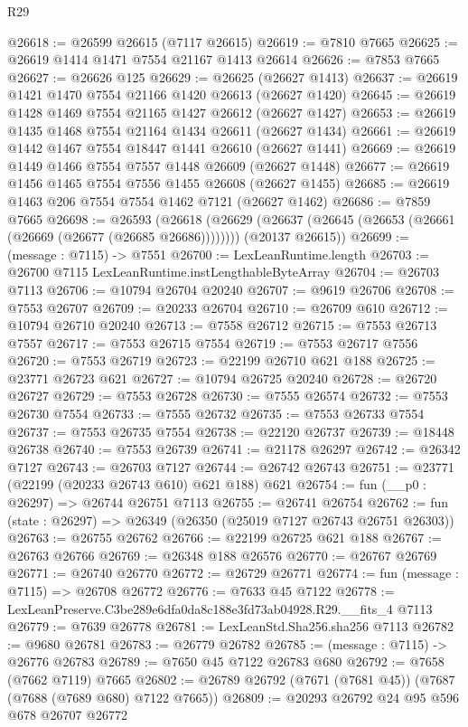 \begin{lexlean}{R29}
\begin{coremodule}
@26618 := @26599 @26615 (@7117 @26615)
@26619 := @7810 @7665
@26625 := @26619 @1414 @1471 @7554 @21167 @1413 @26614
@26626 := @7853 @7665
@26627 := @26626 @125
@26629 := @26625 (@26627 @1413)
@26637 := @26619 @1421 @1470 @7554 @21166 @1420 @26613 (@26627 @1420)
@26645 := @26619 @1428 @1469 @7554 @21165 @1427 @26612 (@26627 @1427)
@26653 := @26619 @1435 @1468 @7554 @21164 @1434 @26611 (@26627 @1434)
@26661 := @26619 @1442 @1467 @7554 @18447 @1441 @26610 (@26627 @1441)
@26669 := @26619 @1449 @1466 @7554 @7557 @1448 @26609 (@26627 @1448)
@26677 := @26619 @1456 @1465 @7554 @7556 @1455 @26608 (@26627 @1455)
@26685 := @26619 @1463 @206 @7554 @7554 @1462 @7121 (@26627 @1462)
@26686 := @7859 @7665
@26698 := @26593
    (@26618
      (@26629 (@26637 (@26645 (@26653 (@26661 (@26669 (@26677 (@26685 @26686))))))))
      (@20137 @26615))
@26699 := (message : @7115) -> @7551
@26700 := LexLeanRuntime.length
@26703 := @26700 @7115 LexLeanRuntime.instLengthableByteArray
@26704 := @26703 @7113
@26706 := @10794 @26704 @20240
@26707 := @9619 @26706
@26708 := @7553 @26707
@26709 := @20233 @26704
@26710 := @26709 @610
@26712 := @10794 @26710 @20240
@26713 := @7558 @26712
@26715 := @7553 @26713 @7557
@26717 := @7553 @26715 @7554
@26719 := @7553 @26717 @7556
@26720 := @7553 @26719
@26723 := @22199 @26710 @621 @188
@26725 := @23771 @26723 @621
@26727 := @10794 @26725 @20240
@26728 := @26720 @26727
@26729 := @7553 @26728
@26730 := @7555 @26574
@26732 := @7553 @26730 @7554
@26733 := @7555 @26732
@26735 := @7553 @26733 @7554
@26737 := @7553 @26735 @7554
@26738 := @22120 @26737
@26739 := @18448 @26738
@26740 := @7553 @26739
@26741 := @21178 @26297
@26742 := @26342 @7127
@26743 := @26703 @7127
@26744 := @26742 @26743
@26751 := @23771 (@22199 (@20233 @26743 @610) @621 @188) @621
@26754 := fun (__p0 : @26297) => @26744 @26751 @7113
@26755 := @26741 @26754
@26762 := fun (state : @26297) => @26349 (@26350 (@25019 @7127 @26743 @26751 @26303))
@26763 := @26755 @26762
@26766 := @22199 @26725 @621 @188
@26767 := @26763 @26766
@26769 := @26348 @188 @26576
@26770 := @26767 @26769
@26771 := @26740 @26770
@26772 := @26729 @26771
@26774 := fun (message : @7115) => @26708 @26772
@26776 := @7633 @45 @7122
@26778 := LexLeanPreserve.C3be289e6dfa0da8c188e3fd73ab04928.R29.__fits_4 @7113
@26779 := @7639 @26778
@26781 := LexLeanStd.Sha256.sha256 @7113
@26782 := @9680 @26781
@26783 := @26779 @26782
@26785 := (message : @7115) -> @26776 @26783
@26789 := @7650 @45 @7122 @26783 @680
@26792 := @7658 (@7662 @7119) @7665
@26802 := @26789 @26792 (@7671 (@7681 @45)) (@7687 (@7688 (@7689 @680) @7122 @7665))
@26809 := @20293 @26792 @24 @95 @596 @678 @26707 @26772

\end{coremodule}
\end{lexlean}
